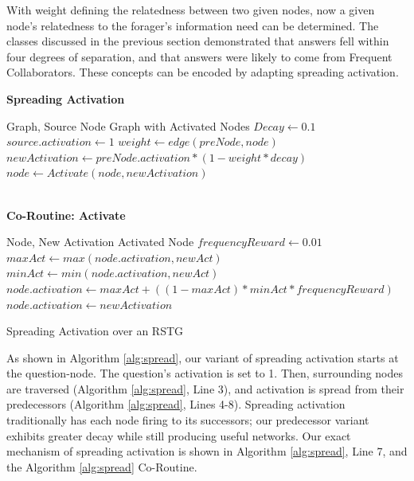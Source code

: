 \documentclass[conference]{IEEEtran}
\begin{document}
With weight defining the relatedness between two given nodes, now a given node's relatedness to the forager's information need can be determined. The classes discussed in the previous section demonstrated that answers fell within four degrees of separation, and that answers were likely to come from Frequent Collaborators. These concepts can be encoded by adapting spreading activation.

\begin{algorithm}
	\textbf{Spreading Activation}
	\begin{algorithmic}[1]
		\renewcommand{\algorithmicrequire}{\textbf{Input:}}
 		\renewcommand{\algorithmicensure}{\textbf{Output:}}
		\REQUIRE Graph, Source Node 
		\ENSURE Graph with Activated Nodes
		\STATE $Decay \leftarrow 0.1$
		\STATE $source.activation\leftarrow 1$
						\STATE $weight \leftarrow edge(preNode,node)$
						\STATE $newActivation \leftarrow preNode.activation * (1 - weight * decay)$
						\STATE $node \leftarrow Activate(node, newActivation)$
					\ENDIF
				\ENDFOR
			\ENDFOR
	\end{algorithmic}
	~\\
	\textbf{Co-Routine: Activate}
	\begin{algorithmic}[1]
		\renewcommand{\algorithmicrequire}{\textbf{Input:}}
 		\renewcommand{\algorithmicensure}{\textbf{Output:}}
		\REQUIRE Node, New Activation
		\ENSURE Activated Node
		\STATE $frequencyReward \leftarrow 0.01$
			\STATE $maxAct \leftarrow max(node.activation, newAct)$
			\STATE $minAct \leftarrow min(node.activation, newAct)$
			\STATE $node.activation \leftarrow maxAct + ((1-maxAct) * minAct * frequencyReward)$
		\ELSE
			\STATE $node.activation \leftarrow newActivation$
		\ENDIF
	\end{algorithmic}
\caption{Spreading Activation over an RSTG}
\label{alg:spread}
\end{algorithm}

As shown in Algorithm \ref{alg:spread}, our variant of spreading activation starts at the question-node. The question's activation is set to 1. Then, surrounding nodes are traversed (Algorithm \ref{alg:spread}, Line 3), and activation is spread from their predecessors (Algorithm \ref{alg:spread}, Lines 4-8). Spreading activation traditionally has each node firing to its successors; our predecessor variant exhibits greater decay while still producing useful networks. Our exact mechanism of spreading activation is shown in Algorithm \ref{alg:spread}, Line 7, and the Algorithm \ref{alg:spread} Co-Routine.
\end{document}
